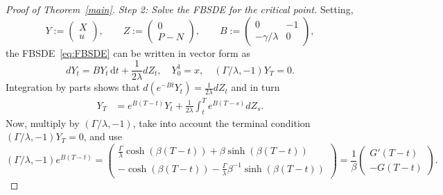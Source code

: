 \documentclass[11pt]{article}
\theoremstyle{definition}
\theoremstyle{remark}
\newcommand{\de}{\,\mathrm{d}}
\begin{document}
\begin{proof}[Proof of Theorem~\ref{main}]
\emph{Step 2: Solve the FBSDE for the critical point.} 
Setting,
\[
 Y:=\begin{pmatrix} X \\ u\end{pmatrix},\qquad Z:=\begin{pmatrix} 0 \\ P-N\end{pmatrix},\qquad B:=\begin{pmatrix} 0 & -1 \\ -\gamma/\lambda & 0\end{pmatrix},
\]
the FBSDE~\eqref{eq:FBSDE} can be written in vector form as 
\[
dY_t = B Y_t \de t + \frac{1}{2\lambda}dZ_t, \quad Y^1_0=x, \quad (\Gamma/\lambda, -1)Y_T = 0.
\]
Integration by parts shows that $d(e^{-B t}Y_t)=\frac{1}{2\lambda}dZ_t$ and in turn
\begin{align*}
Y_T &= e^{B(T-t)}Y_t+\frac{1}{2\lambda}\int_t^T e^{B(T-s)}dZ_s.%
\end{align*}
Now, multiply by $(\Gamma/\lambda,-1)$, take into account the terminal condition $(\Gamma/\lambda, -1)Y_T = 0$, and use  
$$
(\Gamma/\lambda, -1)e^{B(T-t)}=\begin{pmatrix} \frac{\Gamma}{\lambda}\cosh(\beta (T-t))+\beta \sinh(\beta(T-t)) \\ -\cosh(\beta(T-t))-\frac{\Gamma}{\lambda}\beta^{-1} \sinh(\beta(T-t))\end{pmatrix}=\frac{1}{\beta}\begin{pmatrix} G'(T-t) \\ -G(T-t) \end{pmatrix}.
$$

\end{proof}
\end{document}
